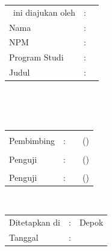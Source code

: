 %
%
%

\vspace*{0.4cm}
\noindent 

\noindent
\begin{tabular}{ll p{9cm}}
	\type~ini diajukan oleh&: & \\
	Nama&: & \penulis \\
	NPM&: & \npm \\
	Program Studi&: & \program \\
	Judul \type&: & \judul \\
\end{tabular} \\

\vspace*{1.0cm}

\noindent {}\\[0.2cm]

\begin{center}
\end{center}

\vspace*{0.3cm}

\begin{tabular}{l l l l }
	& & & \\
	Pembimbing&: & \pembimbing & (\hspace*{3.0cm}) \\
	& & & \\
	Penguji&: & \pengujisatu & (\hspace*{3.0cm}) \\
	& & & \\
	Penguji&: & \pengujidua & (\hspace*{3.0cm}) \\
\end{tabular}\\

\vspace*{2.0cm}

\begin{tabular}{ll l}
	Ditetapkan di&: & Depok\\
	Tanggal&: & \tanggalLulus \\
\end{tabular}


\newpage